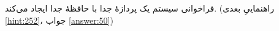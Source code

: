 \section{}
\paragraph{}\label{hint:64}
فراخوانی سیستم  یک پردازهٔ جدا با حافظهٔ جدا ایجاد می‌کند. (راهنماییِ بعدی \ref{hint:252}، جواب \ref{answer:50})
